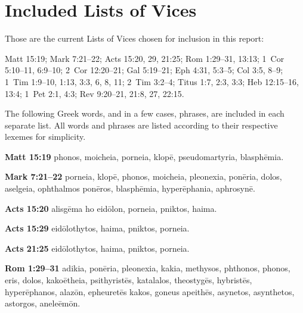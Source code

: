 \section{Included Lists of Vices}
Those are the current Lists of Vices chosen for inclusion in this report:

Matt 15:19; Mark 7:21--22; Acts 15:20, 29, 21:25; Rom 1:29--31, 13:13; 1~Cor 5:10--11, 6:9--10; 2~Cor 12:20--21; Gal 5:19--21; Eph 4:31, 5:3--5; Col 3:5, 8--9; 1~Tim 1:9--10, 1:13, 3:3, 6, 8, 11; 2~Tim 3:2--4; Titus 1:7, 2:3, 3:3; Heb 12:15--16, 13:4; 1~Pet 2:1, 4:3; Rev 9:20--21, 21:8, 27, 22:15.

The following Greek words, and in a few cases, phrases, are included in each separate list. All words and phrases are listed according to their respective lexemes for simplicity.

\textbf{Matt 15:19} \gls{phonos}, \gls{moicheia}, \gls{porneia}, \gls{klopē}, \gls{pseudomartyria}, \gls{blasphēmia}.

\textbf{Mark 7:21--22} \gls{porneia}, \gls{klopē}, \gls{phonos}, %
 \gls{moicheia}, \gls{pleonexia}, \gls{ponēria}, \gls{dolos}, \gls{aselgeia}, \gls{ophthalmos ponēros}, \gls{blasphēmia}, \gls{hyperēphania}, \gls{aphrosynē}. %

\textbf{Acts 15:20} \gls{alisgēma ho eidōlon}, \gls{porneia}, \gls{pniktos}, \gls{haima}.

\textbf{Acts 15:29} \gls{eidōlothytos}, \gls{haima}, \gls{pniktos}, \gls{porneia}.

\textbf{Acts 21:25} \gls{eidōlothytos}, \gls{haima}, \gls{pniktos}, \gls{porneia}.

\textbf{Rom 1:29--31} \gls{adikia}, \gls{ponēria}, \gls{pleonexia}, \gls{kakia}, \gls{methysos}, \gls{phthonos}, \gls{phonos}, \gls{eris}, \gls{dolos}, \gls{kakoētheia}, \gls{psithyristēs}, %
\gls{katalalos}, \gls{theostygēs}, \gls{hybristēs}, \gls{hyperēphanos}, \gls{alazōn}, \gls{epheuretēs kakos}, \gls{goneus apeithēs}, %
\gls{asynetos}, \gls{asynthetos}, \gls{astorgos}, \gls{aneleēmōn}. %

